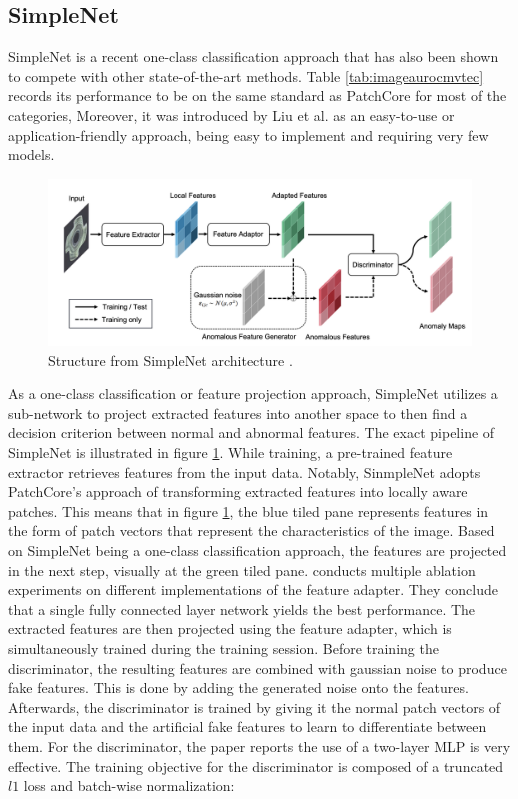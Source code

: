 \subsection{SimpleNet}
\label{subsec:simplenet}
SimpleNet \cite{liu2023simplenet} is a recent one-class classification approach that has also been shown to compete with other state-of-the-art methods. Table \ref{tab:imageaurocmvtec} records its performance to be on the same standard as PatchCore 
for most of the categories, %
Moreover, it was introduced by Liu et al. as an easy-to-use or application-friendly approach, being easy to implement and requiring very few models.

\begin{figure}[H]
\centering
\includegraphics[width=\textwidth]{figures/simplenet_architecture.png}
\caption{Structure from SimpleNet architecture \cite{liu2023simplenet}.}
\label{fig:simplenetpipeline}
\end{figure}

As a one-class classification or feature projection approach, SimpleNet utilizes a sub-network to project extracted features into another space to then find a decision criterion between normal and 
abnormal features. The exact pipeline of SimpleNet is illustrated in figure \ref{fig:simplenetpipeline}. While training, a pre-trained feature extractor retrieves features from the input data. Notably, SinmpleNet adopts PatchCore's approach of transforming extracted features into locally aware patches. This means that in figure \ref{fig:simplenetpipeline}, the blue tiled pane represents features in the form of patch vectors 
that represent the characteristics of the image. Based on SimpleNet being a one-class classification approach, the features are projected in the next step, visually at the green tiled pane. 
\cite{liu2023simplenet} conducts multiple ablation experiments on different implementations of the feature adapter. They conclude that a single fully connected layer network yields the best 
performance. The extracted features are then projected using the feature adapter, which is simultaneously trained during the training session. Before training the discriminator, the resulting 
features are combined with gaussian noise to produce fake features. This is done by adding the generated noise onto the features. Afterwards, the discriminator is trained by giving it 
the normal patch vectors of the input data and the artificial fake features to learn to differentiate between them. For the discriminator, the paper reports the use of a two-layer 
MLP is very effective. The training objective for the discriminator is composed of a truncated $l1$ loss and batch-wise normalization:

